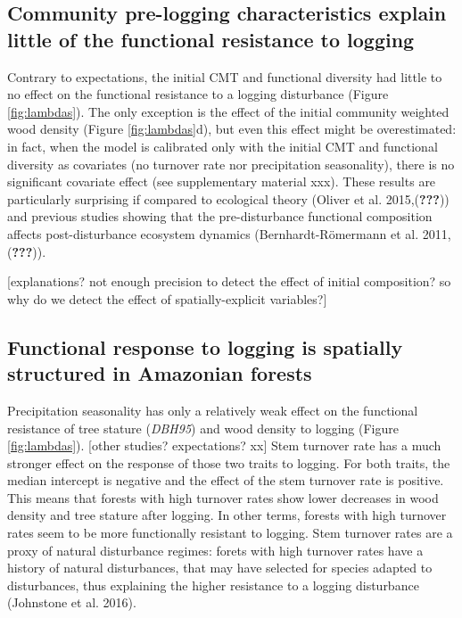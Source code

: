 \documentclass[]{elsarticle} %
\begin{document}
\subsection{Community pre-logging characteristics explain little of the
functional resistance to
logging}\label{community-pre-logging-characteristics-explain-little-of-the-functional-resistance-to-logging}

Contrary to expectations, the initial CMT and functional diversity had
little to no effect on the functional resistance to a logging
disturbance (Figure \ref{fig:lambdas}). The only exception is the effect
of the initial community weighted wood density (Figure
\ref{fig:lambdas}d), but even this effect might be overestimated: in
fact, when the model is calibrated only with the initial CMT and
functional diversity as covariates (no turnover rate nor precipitation
seasonality), there is no significant covariate effect (see
supplementary material xxx). These results are particularly surprising
if compared to ecological theory (Oliver et al. 2015,({\textbf{???}}))
and previous studies showing that the pre-disturbance functional
composition affects post-disturbance ecosystem dynamics
(Bernhardt-Römermann et al. 2011,({\textbf{???}})).

{[}explanations? not enough precision to detect the effect of initial
composition? so why do we detect the effect of spatially-explicit
variables?{]}

\subsection{Functional response to logging is spatially structured in
Amazonian
forests}\label{functional-response-to-logging-is-spatially-structured-in-amazonian-forests}

Precipitation seasonality has only a relatively weak effect on the
functional resistance of tree stature (\emph{DBH95}) and wood density to
logging (Figure \ref{fig:lambdas}). {[}other studies? expectations?
xx{]} Stem turnover rate has a much stronger effect on the response of
those two traits to logging. For both traits, the median intercept is
negative and the effect of the stem turnover rate is positive. This
means that forests with high turnover rates show lower decreases in wood
density and tree stature after logging. In other terms, forests with
high turnover rates seem to be more functionally resistant to logging.
Stem turnover rates are a proxy of natural disturbance regimes: forets
with high turnover rates have a history of natural disturbances, that
may have selected for species adapted to disturbances, thus explaining
the higher resistance to a logging disturbance (Johnstone et al. 2016).
\end{document}
